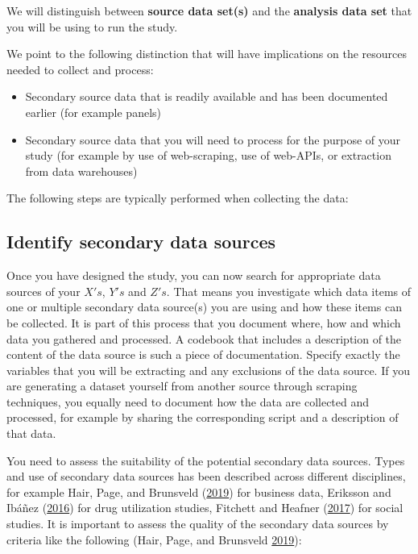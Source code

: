\documentclass[
]{book}
\providecommand{\tightlist}{%
  \setlength{\itemsep}{0pt}\setlength{\parskip}{0pt}}
\begin{document}
We will distinguish between \textbf{source data set(s)} and the
\textbf{analysis data set} that you will be using to run the study.

We point to the following distinction that will have implications on the
resources needed to collect and process:

\begin{itemize}
\tightlist
\item
  Secondary source data that is readily available and has been
  documented earlier (for example panels)
\item
  Secondary source data that you will need to process for the purpose of
  your study (for example by use of web-scraping, use of web-APIs, or
  extraction from data warehouses)
\end{itemize}

The following steps are typically performed when collecting the data:

\hypertarget{identify-secondary-data-sources}{%
\subsection{Identify secondary data
sources}\label{identify-secondary-data-sources}}

Once you have designed the study, you can now search for appropriate
data sources of your \(X's\), \(Y's\) and \(Z's\). That means you
investigate which data items of one or multiple secondary data source(s)
you are using and how these items can be collected. It is part of this
process that you document where, how and which data you gathered and
processed. A codebook that includes a description of the content of the
data source is such a piece of documentation. Specify exactly the
variables that you will be extracting and any exclusions of the data
source. If you are generating a dataset yourself from another source
through scraping techniques, you equally need to document how the data
are collected and processed, for example by sharing the corresponding
script and a description of that data.

You need to assess the suitability of the potential secondary data
sources. Types and use of secondary data sources has been described
across different disciplines, for example Hair, Page, and Brunsveld
(\protect\hyperlink{ref-hair_nature_2019}{2019}) for business data,
Eriksson and Ibáñez
(\protect\hyperlink{ref-eriksson_secondary_2016}{2016}) for drug
utilization studies, Fitchett and Heafner
(\protect\hyperlink{ref-fitchett_quantitative_2017}{2017}) for social
studies. It is important to assess the quality of the secondary data
sources by criteria like the following (Hair, Page, and Brunsveld
\protect\hyperlink{ref-hair_nature_2019}{2019}):
\end{document}

